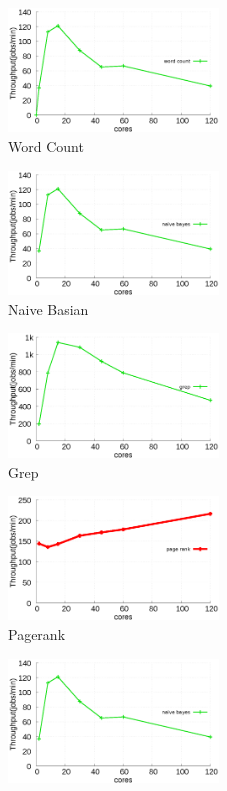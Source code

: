 \begin{figure}[tb]
    \centering
    \begin{subfigure}[b]{0.33\textwidth}
        \includegraphics[width=2.2in]{graph/wc.eps}
        \caption{Word Count}
    \end{subfigure}%
    \begin{subfigure}[b]{0.33\textwidth}
        \includegraphics[width=2.2in]{graph/nb.eps}
        \caption{Naive Basian}
    \end{subfigure}%
    \begin{subfigure}[b]{0.33\textwidth}
        \includegraphics[width=2.2in]{graph/grep.eps}
        \caption{Grep}
    \end{subfigure}
        \begin{subfigure}[b]{0.33\textwidth}
        \includegraphics[width=2.2in]{graph/pagerank.eps}
        \caption{Pagerank}
    \end{subfigure}%
     \begin{subfigure}[b]{0.33\textwidth}
        \includegraphics[width=2.2in]{graph/nb.eps}

\end{subfigure}
\end{figure}
